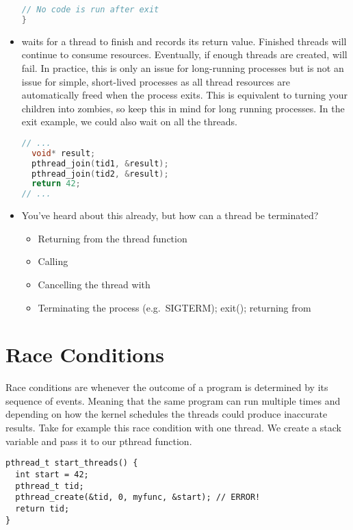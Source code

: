 \begin{itemize}
\begin{lstlisting}[language=C]
  // No code is run after exit
}
\end{lstlisting}

\item {} waits for a thread to finish and records its return value. Finished threads will continue to consume resources. Eventually, if enough threads are created,  will fail. In practice, this is only an issue for long-running processes but is not an issue for simple, short-lived processes as all thread resources are automatically freed when the process exits. This is equivalent to turning your children into zombies, so keep this in mind for long running processes. In the exit example, we could also wait on all the threads.

\begin{lstlisting}[language=C]
// ...
  void* result;
  pthread_join(tid1, &result);
  pthread_join(tid2, &result); 
  return 42;
// ...
\end{lstlisting}

\item You've heard about this already, but how can a thread be terminated? 
\begin{itemize}
  \tightlist
\item Returning from the thread function 
\item Calling  
\item Cancelling the thread with  
\item Terminating the process (e.g.~SIGTERM); exit(); returning from 
\end{itemize}

\end{itemize}

\section{Race Conditions}

Race conditions are whenever the outcome of a program is determined by its sequence of events. Meaning that the same program can run multiple times and depending on how the kernel schedules the threads could produce inaccurate results. Take for example this race condition with one thread. We create a stack variable and pass it to our pthread function.

\begin{lstlisting}
pthread_t start_threads() {
  int start = 42;
  pthread_t tid;
  pthread_create(&tid, 0, myfunc, &start); // ERROR!
  return tid;
}
\end{lstlisting}

